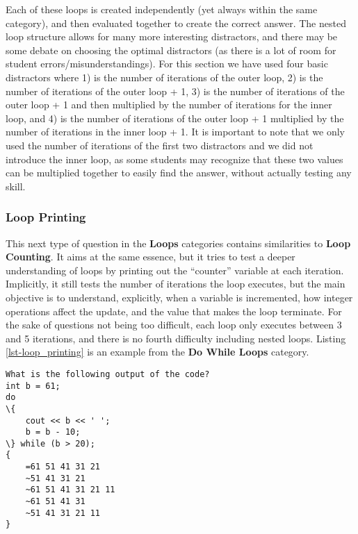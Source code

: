 \documentclass{article}
\begin{document}
Each of these loops is created independently (yet always within the same category), and then evaluated together to create the correct answer. The nested loop structure allows for many more
interesting distractors, and there may be some debate on choosing the optimal distractors (as there is a lot of room for student errors/misunderstandings). For this section we have used four
basic distractors where 1)  is the number of iterations of the outer loop, 2) is the number of iterations of the outer loop + 1, 3) is the number of iterations of the outer loop + 1 and then 
multiplied by the number of iterations for the inner loop, and 4) is the number of iterations of the outer loop + 1 multiplied by the number of iterations in the inner loop + 1. It is important to 
note that we only used the number of iterations of the first two distractors and we did not introduce the inner loop, as some students may recognize that these two values can be multiplied 
together to easily find the answer, without actually testing any skill.

\subsubsection{Loop Printing} \label{subsubsec-loop_printing}

This next type of question in the \textbf{Loops} categories contains similarities to \textbf{Loop Counting}. It aims at the same essence, but it tries to test a deeper understanding of loops by printing out the 
``counter'' variable at each iteration. Implicitly, it still tests the number of iterations the loop executes, but the main objective is to understand, explicitly, when a variable is incremented,
how integer operations affect the update, and the value that makes the loop terminate. For the sake of questions not being too difficult, each loop only executes between 3 and 5 iterations, and there is no fourth difficulty including nested loops. Listing \ref{lst-loop_printing} is an example from the \textbf{Do While Loops} category.

\begin{lstlisting}[caption={Loop Printing Difficulty 2 GIFT Example}, label=lst-loop_printing]
What is the following output of the code? 
int b = 61; 
do
\{ 
	cout << b << ' '; 
	b = b - 10; 
\} while (b > 20);
{
	=61 51 41 31 21
	~51 41 31 21
	~61 51 41 31 21 11
	~61 51 41 31
	~51 41 31 21 11
}
\end{lstlisting}
\end{document}
